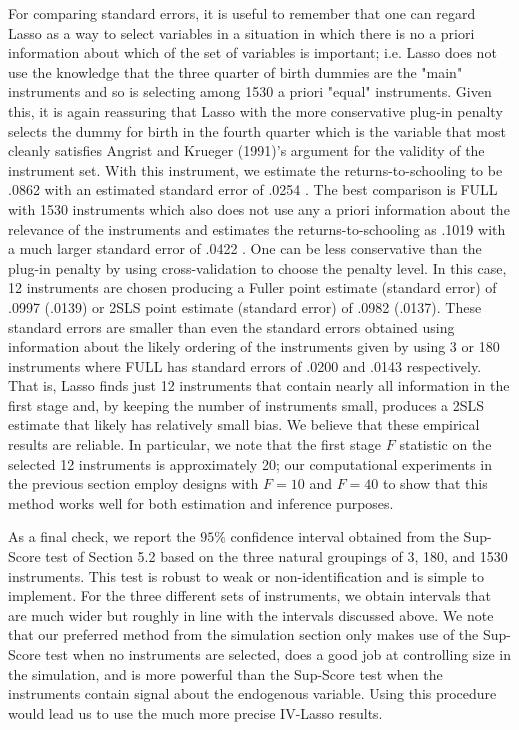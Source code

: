 \documentclass[10pt]{article}
\begin{document}
For comparing standard errors, it is useful to remember that one can regard Lasso as a way to select variables in a situation in which there is no a priori information about which of the set of variables is important; i.e. Lasso does not use the knowledge that the three quarter of birth dummies are the "main" instruments and so is selecting among 1530 a priori "equal" instruments. Given this, it is again reassuring that Lasso with the more conservative plug-in penalty selects the dummy for birth in the fourth quarter which is the variable that most cleanly satisfies Angrist and Krueger (1991)'s argument for the validity of the instrument set. With this instrument, we estimate the returns-to-schooling to be .0862 with an estimated standard error of .0254 . The best comparison is FULL with 1530 instruments which also does not use any a priori information about the relevance of the instruments and estimates the returns-to-schooling as .1019 with a much larger standard error of .0422 . One can be less conservative than the plug-in penalty by using cross-validation to choose the penalty level. In this case, 12 instruments are chosen producing a Fuller point estimate (standard error) of .0997 (.0139) or 2SLS point estimate (standard error) of .0982 (.0137). These standard errors are smaller than even the standard errors obtained using information about the likely ordering of the instruments given by using 3 or 180 instruments where FULL has standard errors of .0200 and .0143 respectively. That is, Lasso finds just 12 instruments that contain nearly all information in the first stage and, by keeping the number of instruments small, produces a 2SLS estimate that likely has relatively small bias. We believe that these empirical results are reliable. In particular, we note that the first stage \(F\) statistic on the selected 12 instruments is approximately 20; our computational experiments in the previous section employ designs with \(F=10\) and \(F=40\) to show that this method works well for both estimation and inference purposes.

As a final check, we report the \(95 \%\) confidence interval obtained from the Sup-Score test of Section 5.2 based on the three natural groupings of 3, 180, and 1530 instruments. This test is robust to weak or non-identification and is simple to implement. For the three different sets of instruments, we obtain intervals that are much wider but roughly in line with the intervals discussed above. We note that our preferred method from the simulation section only makes use of the Sup-Score test when no instruments are selected, does a good job at controlling size in the simulation, and is more powerful than the Sup-Score test when the instruments contain signal about the endogenous variable. Using this procedure would lead us to use the much more precise IV-Lasso results.
\end{document}
